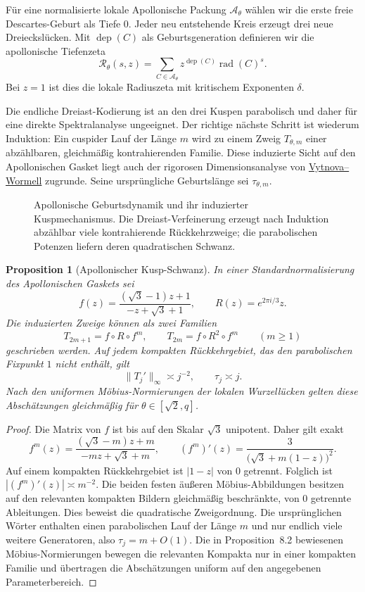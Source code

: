 \documentclass[11pt,a4paper]{article}
\newtheorem{proposition}[remark]{Proposition}
\begin{document}
Für eine normalisierte lokale Apollonische Packung $\mathcal A_\theta$
wählen wir die erste freie Descartes-Geburt als Tiefe $0$. Jeder neu
entstehende Kreis erzeugt drei neue Dreieckslücken. Mit
$\operatorname{dep}(C)$ als Geburtsgeneration definieren wir die
apollonische Tiefenzeta
\[
 \mathscr R_\theta(s,z)
 =
 \sum_{C\in\mathcal A_\theta}
 z^{\operatorname{dep}(C)}\operatorname{rad}(C)^s.
\]
Bei $z=1$ ist dies die lokale Radiuszeta mit kritischem Exponenten
$\delta$.

Die endliche Dreiast-Kodierung ist an den drei Kuspen parabolisch und
daher für eine direkte Spektralanalyse ungeeignet. Der richtige
nächste Schritt ist wiederum Induktion: Ein cuspider Lauf der Länge $m$
wird zu einem Zweig $T_{\theta,m}$ einer abzählbaren, gleichmäßig
kontrahierenden Familie. Diese induzierte Sicht auf den Apollonischen
Gasket liegt auch der rigorosen Dimensionsanalyse von
\href{https://arxiv.org/abs/2406.04922}{Vytnova--Wormell} zugrunde.
Seine ursprüngliche Geburtslänge sei $\tau_{\theta,m}$.

\begin{figure}[htbp]
 \centering
 
 \caption{Apollonische Geburtsdynamik und ihr induzierter
 Kuspmechanismus. Die Dreiast-Verfeinerung erzeugt nach Induktion
 abzählbar viele kontrahierende Rückkehrzweige; die parabolischen
 Potenzen liefern deren quadratischen Schwanz.}
 \label{fig:apollonian-induction}
\end{figure}

\begin{proposition}[Apollonischer Kusp-Schwanz]
In einer Standardnormalisierung des Apollonischen Gaskets sei
\[
 f(z)=\frac{(\sqrt3-1)z+1}{-z+\sqrt3+1},
 \qquad
 R(z)=e^{2\pi i/3}z.
\]
Die induzierten Zweige können als zwei Familien
\[
 T_{2m+1}=f\circ R\circ f^m,
 \qquad
 T_{2m}=f\circ R^2\circ f^m
 \qquad(m\ge1)
\]
geschrieben werden. Auf jedem kompakten Rückkehrgebiet, das den
parabolischen Fixpunkt $1$ nicht enthält, gilt
\[
 \|T_j'\|_\infty\asymp j^{-2},
 \qquad
 \tau_j\asymp j.
\]
Nach den uniformen Möbius-Normierungen der lokalen Wurzellücken gelten
diese Abschätzungen gleichmäßig für
$\theta\in[\sqrt2,q]$.
\end{proposition}

\begin{proof}
Die Matrix von $f$ ist bis auf den Skalar $\sqrt3$ unipotent. Daher
gilt exakt
\[
 f^m(z)
 =
 \frac{(\sqrt3-m)z+m}{-mz+\sqrt3+m},
 \qquad
 (f^m)'(z)
 =
 \frac3{\bigl(\sqrt3+m(1-z)\bigr)^2}.
\]
Auf einem kompakten Rückkehrgebiet ist $|1-z|$ von $0$ getrennt.
Folglich ist $|(f^m)'(z)|\asymp m^{-2}$. Die beiden festen äußeren
Möbius-Abbildungen besitzen auf den relevanten kompakten Bildern
gleichmäßig beschränkte, von $0$ getrennte Ableitungen. Dies beweist
die quadratische Zweigordnung. Die ursprünglichen Wörter enthalten
einen parabolischen Lauf der Länge $m$ und nur endlich viele weitere
Generatoren, also $\tau_j=m+O(1)$. Die in
Proposition~8.2 bewiesenen Möbius-Normierungen bewegen die relevanten
Kompakta nur in einer kompakten Familie und übertragen die
Abschätzungen uniform auf den angegebenen Parameterbereich.
\end{proof}
\end{document}
